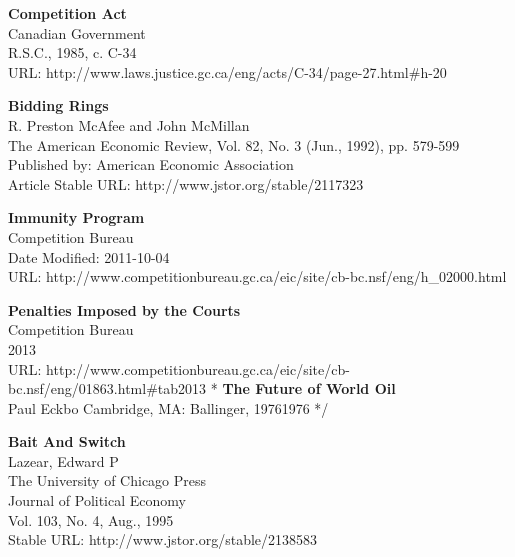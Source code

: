 \documentclass[12pt]{article}
\newcommand\bold[1]{\textbf{#1}}
\begin{document}
\begin{thebibliography}{1}

\bold{Competition Act}\\
Canadian Government\\
R.S.C., 1985, c. C-34\\
URL: http://www.laws.justice.gc.ca/eng/acts/C-34/page-27.html\#h-20


\bold{Bidding Rings}\\
R. Preston McAfee and John McMillan\\
The American Economic Review, Vol. 82, No. 3 (Jun., 1992), pp. 579-599\\
Published by: American Economic Association\\
Article Stable URL: http://www.jstor.org/stable/2117323

\bold{Immunity Program}\\
Competition Bureau\\
Date Modified: 2011-10-04\\
URL: http://www.competitionbureau.gc.ca/eic/site/cb-bc.nsf/eng/h\_02000.html

\bold{Penalties Imposed by the Courts}\\
Competition Bureau\\
2013\\
URL: http://www.competitionbureau.gc.ca/eic/site/cb-bc.nsf/eng/01863.html\#tab2013
\/*
\bold{The Future of World Oil}\\
Paul Eckbo
Cambridge, MA: Ballinger, 19761976
*/

\bold{Bait And Switch}\\
Lazear, Edward P\\
The University of Chicago Press\\
Journal of Political Economy\\
Vol. 103, No. 4, Aug., 1995\\
Stable URL: http://www.jstor.org/stable/2138583

  \end{thebibliography}
\end{document}
